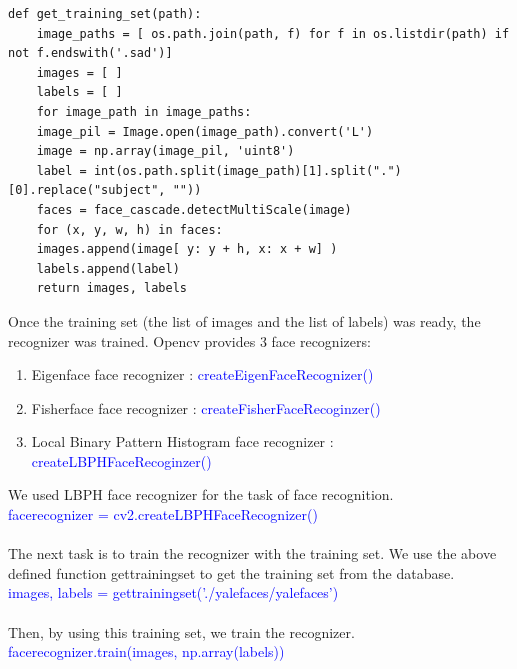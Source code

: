 \documentclass[a4paper,12pt]{article}
\begin{document}
\begin{verbatim}
def get_training_set(path): 
    image_paths = [ os.path.join(path, f) for f in os.listdir(path) if not f.endswith('.sad')] 
    images = [ ]
    labels = [ ] 
    for image_path in image_paths: 
    image_pil = Image.open(image_path).convert('L') 
    image = np.array(image_pil, 'uint8') 
    label = int(os.path.split(image_path)[1].split(".")[0].replace("subject", "")) 
    faces = face_cascade.detectMultiScale(image) 
    for (x, y, w, h) in faces: 
    images.append(image[ y: y + h, x: x + w] ) 
    labels.append(label) 
    return images, labels 
\end{verbatim}

Once the training set (the list of images and the list of labels) was ready, the recognizer was trained. Opencv provides 3 face recognizers:

\begin{enumerate}
 \item Eigenface face recognizer : \textcolor{blue}{createEigenFaceRecognizer()}
 \item Fisherface face recognizer : \textcolor{blue}{createFisherFaceRecoginzer()}
 \item Local Binary Pattern Histogram face recognizer : \textcolor{blue}{createLBPHFaceRecoginzer()}
\end{enumerate}

We used LBPH face recognizer for the task of face recognition.
\\
\newline \textcolor{blue}{face\textunderscore recognizer = cv2.createLBPHFaceRecognizer()}
\\
\\
The next task is to train the recognizer with the training set. We use the above defined function get\textunderscore training\textunderscore set to get 
the training set from the database. 
\\
\newline \textcolor{blue}{images, labels = get\textunderscore training\textunderscore set('./yalefaces/yalefaces') }
\\
\\
Then, by using this training set, we train the recognizer. 
\\
\newline \textcolor{blue}{face\textunderscore recognizer.train(images, np.array(labels))} 
\\
\\
\end{document}
